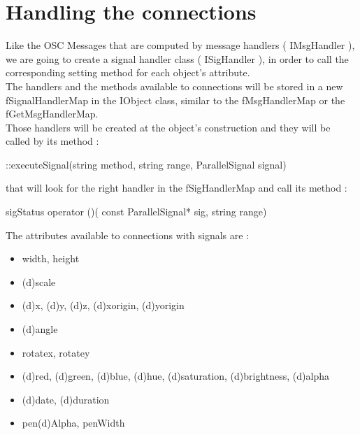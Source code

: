 \documentclass[a4paper]{article}
\begin{document}
\section{Handling the connections}\label{sec:handler}

Like the OSC Messages that are computed by message handlers ( {\asciifamily \color{ForestGreen}IMsgHandler} ), we are going to create a signal handler class ( {\asciifamily \color{ForestGreen}ISigHandler} ), in order to call the corresponding setting method for each object's attribute. 
\\

The handlers and the methods available to connections will be stored in a new {\asciifamily \color{ForestGreen}fSignalHandlerMap} in the {\asciifamily \color{ForestGreen}IObject} class, similar to the {\asciifamily \color{ForestGreen}fMsgHandlerMap} or the {\asciifamily \color{ForestGreen}fGetMsgHandlerMap}. 
\\

Those handlers will be created at the object's construction and they will be called by its method : 
\begin{center}
{::executeSignal({\color{Violet}string} method, {\color{Violet}string} range, {\color{ForestGreen}ParallelSignal} signal)}
\end{center}

that will look for the right handler in the {\asciifamily \color{ForestGreen} fSigHandlerMap} and call its method :
\begin{center}
{ {\color{ForestGreen} sigStatus} operator ()({\color{VioletRed} const} {\color{ForestGreen} ParallelSignal}* sig, {\color{Violet} string} range)}
\end{center}

\newpage

The attributes available to connections with signals are :

\begin{itemize}
  \item width, height
  \item (d)scale
  \item (d)x, (d)y, (d)z, (d)xorigin, (d)yorigin
  \item (d)angle
  \item rotatex, rotatey
  \item (d)red, (d)green, (d)blue, (d)hue, (d)saturation, (d)brightness, (d)alpha
  \item (d)date, (d)duration
  \item pen(d)Alpha, penWidth
\end{itemize}
\end{document}
